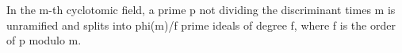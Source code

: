 In the m-th cyclotomic field, a prime p not dividing the discriminant times m is unramified and splits into phi(m)/f prime ideals of degree f, where f is the order of p modulo m.
